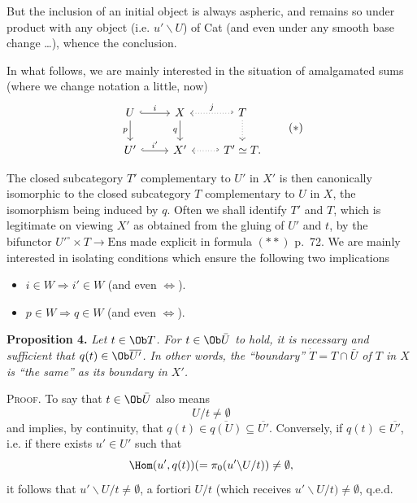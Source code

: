 
But the inclusion of an initial object is always aspheric, and remains so under product with any object (i.e. $u'\backslash U$) of Cat (and even under any smooth base change \dots), whence the conclusion.

In what follows, we are mainly interested in the situation of amalgamated sums (where we change notation a little, now)
\[
\begin{tikzcd}
U \arrow[r, hook, "i"] \arrow[d, "p"'] & X \arrow[d, "q"'] & T \arrow[l, hook', dotted, "j"'] \arrow[d, dotted] \\
U' \arrow[r, hook, "i'"] & X' & T' \simeq T. \arrow[l, hook', dotted]
\end{tikzcd}
\tag*{$(*)$}
\]

The closed subcategory $T'$ complementary to $U'$ in $X'$ is then canonically isomorphic to the closed subcategory $T$ complementary to $U$ in $X$, the isomorphism being induced by $q$. Often we shall identify $T'$ and $T$, which is legitimate on viewing $X'$ as obtained from the gluing of $U'$ and $t$, by the bifunctor $U'^{\circ}\times T\longrightarrow \mathrm{Ens}$ made explicit in formula $(**)$ p.~72. We are mainly interested in isolating conditions which ensure the following two implications

\begin{itemize}
\item[a)] $i\in W\Longrightarrow i'\in W$ (and even $\Longleftrightarrow$).
\item[b)] $p\in W\Longrightarrow q\in W$ (and even $\Longleftrightarrow$).
\end{itemize}

\textbf{Proposition 4.} \textit{Let $t\in\Ob T$. For $t\in\Ob\bar{U}$ to hold, it is necessary and sufficient that $q(t)\in\Ob\overline{U'}$. In other words, the ``boundary'' $\dot{T}=T\cap\bar{U}$ of $T$ in $X$ is ``the same'' as its boundary in $X'$.}

\textsc{Proof}. To say that $t\in\Ob\bar{U}$ also means
\[
U/t\neq\emptyset
\]
and implies, by continuity, that $q(t)\in\overline{q(U)}\subseteq\overline{U'}$. Conversely, if $q(t)\in\overline{U'}$, i.e. if there exists $u'\in U'$ such that
\[
\Hom(u',q(t))(=\pi_0(u'\backslash U/t))\neq\emptyset,
\]
it follows that $u'\backslash U/t\neq\emptyset$, a fortiori $U/t$ (which receives $u'\backslash U/t)\neq\emptyset$, q.e.d.

